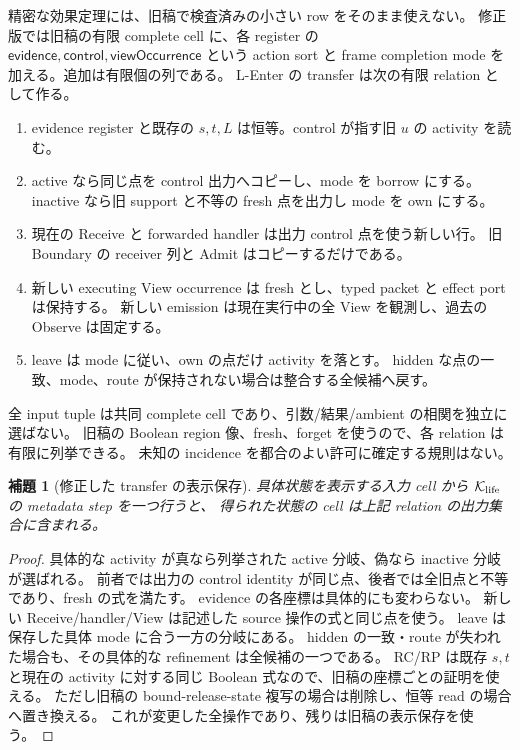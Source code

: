 \documentclass[11pt,a4paper]{article}
\newtheorem{lemma}[definition]{補題}
\newcommand{\Core}{\mathcal K}
\begin{document}
精密な効果定理には、旧稿で検査済みの小さい row をそのまま使えない。
修正版では旧稿の有限 complete cell に、各 register の
\(\mathsf{evidence},\mathsf{control},\mathsf{viewOccurrence}\) という action sort と
frame completion mode を加える。追加は有限個の列である。
L-Enter の transfer は次の有限 relation として作る。
\begin{enumerate}
\item evidence register と既存の \(s,t,L\) は恒等。control が指す旧 \(u\) の activity を読む。
\item active なら同じ点を control 出力へコピーし、mode を borrow にする。
inactive なら旧 support と不等の fresh 点を出力し mode を own にする。
\item 現在の Receive と forwarded handler は出力 control 点を使う新しい行。
旧 Boundary の receiver 列と Admit はコピーするだけである。
\item 新しい executing View occurrence は fresh とし、typed packet と effect port は保持する。
新しい emission は現在実行中の全 View を観測し、過去の Observe は固定する。
\item leave は mode に従い、own の点だけ activity を落とす。
hidden な点の一致、mode、route が保持されない場合は整合する全候補へ戻す。
\end{enumerate}
全 input tuple は共同 complete cell であり、引数/結果/ambient の相関を独立に選ばない。
旧稿の Boolean region 像、fresh、forget を使うので、各 relation は有限に列挙できる。
未知の incidence を都合のよい許可に確定する規則はない。

\begin{lemma}[修正した transfer の表示保存]
\label{lem:life-transfer}
具体状態を表示する入力 cell から \(\Core_{\rm life}\) の metadata step を一つ行うと、
得られた状態の cell は上記 relation の出力集合に含まれる。
\end{lemma}
\begin{proof}
具体的な activity が真なら列挙された active 分岐、偽なら inactive 分岐が選ばれる。
前者では出力の control identity が同じ点、後者では全旧点と不等であり、fresh の式を満たす。
evidence の各座標は具体的にも変わらない。
新しい Receive/handler/View は記述した source 操作の式と同じ点を使う。
leave は保存した具体 mode に合う一方の分岐にある。
hidden の一致・route が失われた場合も、その具体的な refinement は全候補の一つである。
RC/RP は既存 \(s,t\) と現在の activity に対する同じ Boolean 式なので、旧稿の座標ごとの証明を使える。
ただし旧稿の bound-release-state 複写の場合は削除し、恒等 read の場合へ置き換える。
これが変更した全操作であり、残りは旧稿の表示保存を使う。
\end{proof}
\end{document}
